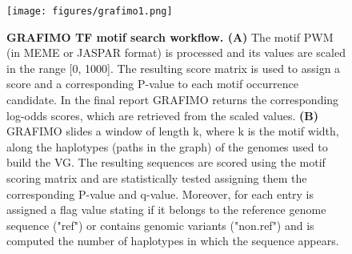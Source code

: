 \documentclass[a4paper, titlepage, openright]{book}
\newcommand{\grafimo}{GRAFIMO\xspace}
\begin{document}
\begin{figure}
	\centering
	\texttt{[image: figures/grafimo1.png]}
	\caption[\grafimo TF motif search workflow.]{\textbf{\grafimo TF motif search workflow. (A)} The motif PWM (in MEME or JASPAR format) is processed and its values are scaled in the range [0, 1000]. The resulting score matrix is used to assign a score and a corresponding P-value to each motif occurrence candidate. In the final report \grafimo returns the corresponding log-odds scores, which are retrieved from the scaled values. \textbf{(B)} \grafimo slides a window of length k, where k is the motif width, along the haplotypes (paths in the graph) of the genomes used to build the VG. The resulting sequences are scored using the motif scoring matrix and are statistically tested assigning them the corresponding P-value and q-value. Moreover, for each entry is assigned a flag value stating if it belongs to the reference genome sequence ("ref") or contains genomic variants ("non.ref") and is computed the number of haplotypes in which the sequence appears.}
	\label{fig:grafimo1}
\end{figure} 

\end{document}
